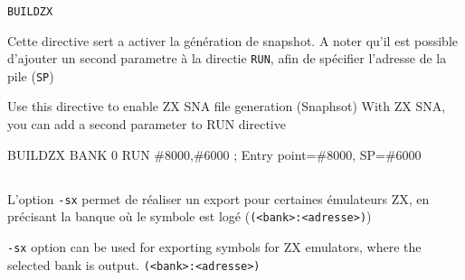 \subsubsection{}\label{ZXBANK}
\begin{verbatim}
BUILDZX
\end{verbatim}

\begin{xfr}
Cette directive sert a activer la génération de snapshot.
A noter qu'il est possible d'ajouter un second parametre à la directie \texttt{RUN}, afin de spécifier l'adresse de la pile (\texttt{SP})
\end{xfr}

\begin{xen}
Use this directive to enable ZX SNA file generation (Snaphsot) 
With ZX SNA, you can add a second parameter to RUN directive
\end{xen}

\begin{code}
BUILDZX
BANK 0
RUN \#8000,\#6000 ; Entry point=\#8000, SP=\#6000
\end{code}

\subsection{}

\begin{xfr}
L'option \texttt{-sx} permet de réaliser un export pour certaines émulateurs ZX, en précisant la banque où le symbole est logé (\texttt{(<bank>:<adresse>)})
\end{xfr}

\begin{xen}
\texttt{-sx} option can be used for exporting symbols for ZX emulators, where the selected bank is output. \texttt{(<bank>:<adresse>)}
\end{xen}
